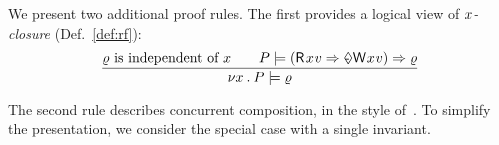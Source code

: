 


We present two additional proof rules. 
The first provides a logical view of \emph{$x$-closure} (Def.~\ref{def:rf}):
\begin{displaymath}
  \frac{
    \afo \text{ is independent of } \aLoc
    \qquad
    \aPS \models (\DR{\aLoc}{\aVal} \Rightarrow \once \DW{\aLoc}{\aVal}) \Rightarrow \afo
  }{
    \nu \aLoc \DOT \aPS \models \afo
  }
\end{displaymath}

The second rule describes concurrent composition, in the style of~\citet{Abadi:1993:CS:151646.151649}.  To simplify the presentation, we
consider the special case with a single invariant.

